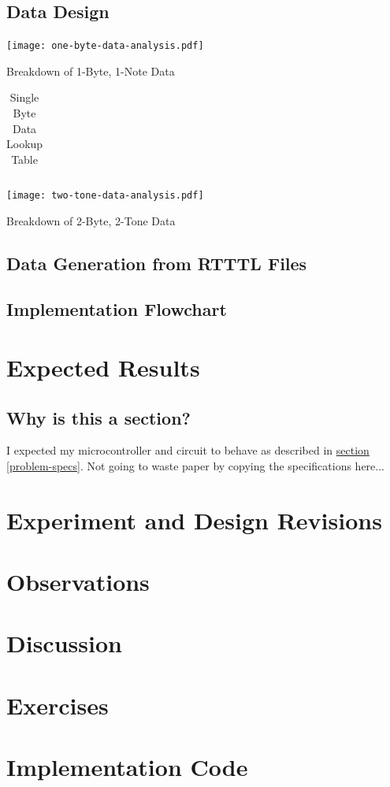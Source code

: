 \documentclass[11pt]{article}
\begin{document}
\subsection{Data Design}

\begin{center}
\texttt{[image: one-byte-data-analysis.pdf]}
\caption{Breakdown of 1-Byte, 1-Note Data}
\label{one-byte-data-breakdown}
\end{center}

\begin{table}
\centering
\caption{Single Byte Data Lookup Table}
\begin{tabular}{c c c}
\hline\hline
\end{tabular}
\label{data-lookup-table}
\end{table}

\begin{center}
\texttt{[image: two-tone-data-analysis.pdf]}
\caption{Breakdown of 2-Byte, 2-Tone Data}
\label{two-byte-data-breakdown}
\end{center}

\subsection{Data Generation from RTTTL Files}

\subsection{Implementation Flowchart}

\section{Expected Results}
\subsection{Why is this a section?}
I expected my microcontroller and circuit to behave as described in
\hyperref[problem-specs]{section \ref{problem-specs}}.
Not going to waste paper by copying the specifications here...

\section{Experiment and Design Revisions}

\section{Observations}

\section{Discussion}

\section{Exercises}

\clearpage
\section{Implementation Code}

\begingroup
\fontsize{10pt}{12pt}

\endgroup
\end{document}
